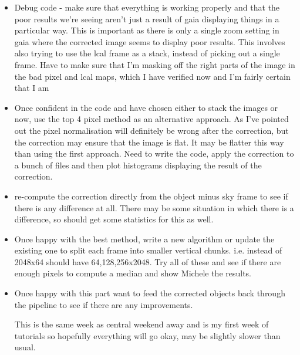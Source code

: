 \documentclass{literature}
\begin{document}
\begin{itemize}
	\item Debug code - make sure that everything is working properly and that the poor results we're seeing aren't just a result of gaia displaying things in a particular way. This is important as there is only a single zoom setting in gaia where the corrected image seems to display poor results. This involves also trying to use the lcal frame as a stack, instead of picking out a single frame. Have to make sure that I'm masking off the right parts of the image in the bad pixel and lcal maps, which I have verified now and I'm fairly certain that I am 
	\item Once confident in the code and have chosen either to stack the images or now, use the top 4 pixel method as an alternative approach. As I've pointed out the pixel normalisation will definitely be wrong after the correction, but the correction may ensure that the image is flat. It may be flatter this way than using the first approach. Need to write the code, apply the correction to a bunch of files and then plot histograms displaying the result of the correction. 
	\item re-compute the correction directly from the object minus sky frame to see if there is any difference at all. There may be some situation in which there is a difference, so should get some statistics for this as well.  
	\item Once happy with the best method, write a new algorithm or update the existing one to split each frame into smaller vertical chunks. i.e. instead of 2048x64 should have 64,128,256x2048. Try all of these and see if there are enough pixels to compute a median and show Michele the results. 
	\item Once happy with this part want to feed the corrected objects back through the pipeline to see if there are any improvements. 

This is the same week as central weekend away and is my first week of tutorials so hopefully everything will go okay, may be slightly slower than usual. 
\end{itemize}
\end{document}
